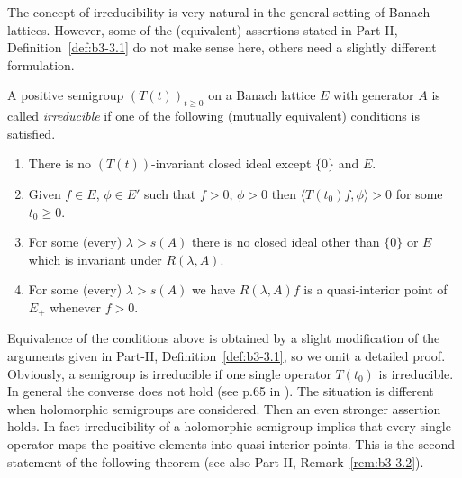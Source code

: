 The concept of irreducibility is very natural in the general setting of Banach lattices.
However, some of the (equivalent) assertions stated in Part-II, Definition~\ref{def:b3-3.1} do not make sense here, others need a slightly different formulation.
\begin{definition}\label{def:c3-3.1}
	
	A positive semigroup $(T(t))_{t\geq 0}$ on a Banach lattice $E$ with generator $A$ is called \emph{irreducible} if one of the following (mutually equivalent) conditions is satisfied.
	\begin{enumerate}[\upshape (a)]
	\item
	There is no $(T(t))$-invariant closed ideal except $\{0\}$ and $E$.
	
	\item 
	Given $f \in E$, $\phi \in E'$ such that $f > 0$, $\phi > 0$ then $\langle T(t_{0})f,\phi \rangle > 0$ for some $t_{0} \geq 0$.
	
    
	\item 
	For some (every) $\lambda > s(A)$ there is no closed ideal other than $\{0\}$ or $E$ which is invariant under $R(\lambda,A)$.
	
	\item 
	For some (every) $\lambda > s(A)$ we have $R(\lambda,A)f$ is a quasi-interior point of\/ $E_{+}$ whenever $f > 0$.
	\end{enumerate}
\end{definition}
Equivalence of the conditions above is obtained by a slight modification of the arguments given in Part-II, Definition~\ref{def:b3-3.1},
so we omit a detailed proof.
Obviously, a semigroup is irreducible if one single operator $T(t_{0})$ is irreducible.
In general the converse does not hold (see p.65 in \textcite{greiner:1982}).
The situation is different when holomorphic semigroups are considered.
Then an even stronger assertion holds. In fact irreducibility of a holomorphic semigroup implies that every single operator maps the positive elements into quasi-interior points.
This is the second statement of the following theorem (see also Part-II, Remark~\ref{rem:b3-3.2}).

